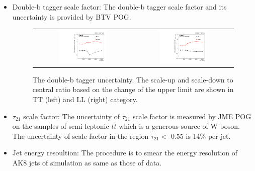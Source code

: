 \begin{itemize}
  \item Double-b tagger scale factor: The double-b tagger scale factor and its uncertainty is provided by BTV POG\citep{BtagRecommendation80XReReco}.
  
\begin{figure}[t]
  \centering
 \begin{tabular}{cc}
    \includegraphics[width=0.5\textwidth]{Figures/plots_uncert/btag_TT.pdf} &
   \includegraphics[width=0.5\textwidth]{Figures/plots_uncert/btag_LL.pdf} \\
  \end{tabular}
  \caption{The double-b tagger uncertainty. The scale-up and scale-down to central ratio based on the change of the upper limit are shown in TT (left) and LL (right) category.}
  \label{fig:hvt_brs}
\end{figure}    
  
  \item $\tau _{21}$ scale factor: The uncertainty of $\tau _{21}$ scale factor is measured by JME POG on the samples of semi-leptonic $t\bar{t}$ which is a generous source of W boson. The uncertainty of scale factor in the region $\tau _{21} <$ 0.55 is 14$\% $ per jet\citep{WTagTWikiWPs}.
 
  \item Jet energy resoultion: The procedure is to smear the energy resolution of AK8 jets of simulation as same as those of data\citep{JER}. 
  

\end{itemize}
